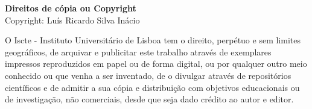 \newpage
\thispagestyle{empty}
\vspace*{1,5cm} %
\noindent %
{\footnotesize %
	\textbf{Direitos de cópia ou Copyright} \\ %
	\textcopyright
	Copyright: Luís Ricardo Silva Inácio \\[-0.5cm] %
	\begin{flushleft} %
		\renewcommand{\baselinestretch}{1}\selectfont %
		\justify %
		O Iscte - Instituto Universitário de Lisboa tem o direito, perpétuo e sem limites geográficos, de arquivar e publicitar este trabalho através de exemplares impressos reproduzidos em papel ou de forma digital, ou por qualquer outro meio conhecido ou que venha a ser inventado, de o divulgar através de repositórios científicos e de admitir a sua cópia e distribuição com objetivos educacionais ou de investigação, não comerciais, desde que seja dado crédito ao autor e editor.
	\end{flushleft}
}
\newpage
